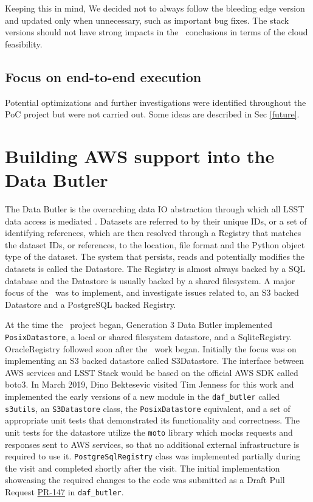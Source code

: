 Keeping this in mind, We decided not to always follow the bleeding edge version and updated only when unnecessary, such as important bug fixes. The stack versions should not have strong impacts in the \poc~conclusions in terms of the cloud feasibility.

\subsection{Focus on end-to-end execution}

Potential optimizations and further investigations were identified throughout the PoC project but were not carried out.
Some ideas are described in Sec \ref{future}.


\section{Building AWS support into the Data Butler}
\label{sec:butler}

The Data Butler is the overarching data IO abstraction through which all LSST data access is mediated . Datasets are referred to by their unique IDs, or a set of identifying references, which are then resolved through a Registry that matches the dataset IDs, or references, to the location, file format and the Python object type of the dataset. The system that persists, reads and potentially modifies the datasets is called the Datastore. The Registry is almost always backed by a SQL database and the Datastore is usually backed by a shared filesystem. A major focus of the \poc~was to implement, and investigate issues related to, an S3 backed Datastore and a PostgreSQL backed Registry.

At the time the \poc~project began, Generation 3 Data Butler implemented \texttt{PosixDatastore}, a local or shared filesystem datastore, and a SqliteRegistry. OracleRegistry followed soon after the \poc~work began. Initially the focus was on implementing an S3 backed datastore called S3Datastore. The interface between AWS services and LSST Stack would be based on the official AWS SDK called boto3. In March 2019, Dino Bektesevic visited Tim Jenness for this work and implemented the early versions of a new module in the \texttt{daf\_butler} called \texttt{s3utils}, an \texttt{S3Datastore} class, the \texttt{PosixDatastore} equivalent, and a set of appropriate unit tests that demonstrated its functionality and correctness. The unit tests for the datastore utilize the \texttt{moto} library which mocks requests and responses sent to AWS services, so that no additional external infrastructure is required to use it. \texttt{PostgreSqlRegistry} class was implemented partially during the visit and completed shortly after the visit. The initial implementation showcasing the required changes to the code was submitted as a Draft Pull Request \href{https://github.com/lsst/daf_butler/pull/147}{PR-147} in \texttt{daf\_butler}.

